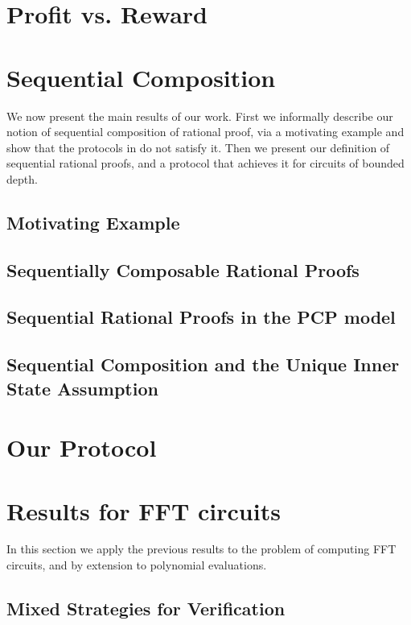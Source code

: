 
\section{Profit vs. Reward}


\section{Sequential Composition}
We now present the main results of our work. First we informally describe our notion of sequential composition of 
rational proof, via a motivating example and show that the protocols in \cite{am,am1,rosen} do not satisfy it. Then we present our definition of sequential rational proofs, and a protocol that achieves it for circuits of bounded depth. 


\subsection{Motivating Example}


\subsection{Sequentially Composable Rational Proofs}


\subsection{Sequential Rational Proofs in the PCP model}


\subsection{Sequential Composition and the Unique Inner State Assumption}
\label{sec:uisa}


\section{Our Protocol}


\section{Results for FFT circuits}

In this section we apply the previous results to the problem of computing FFT circuits, and by extension to polynomial evaluations. 


\subsection{Mixed Strategies for Verification}



